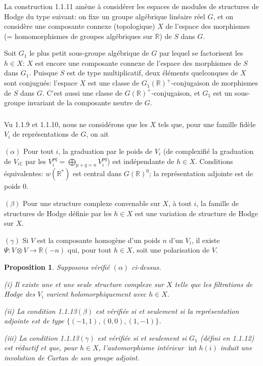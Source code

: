 \documentclass[12pt,a4paper]{article}
\theoremstyle{plain}
\newtheorem{proposition}[theorem]{Proposition}
\theoremstyle{definition}
\theoremstyle{remark}
\DeclareMathOperator{\Int}{int}
\newcommand{\RR}{\mathbb{R}}
\newcommand{\CC}{\mathbb{C}}
\begin{document}
\subsubsection{}

La construction 1.1.11 am\`ene \`a consid\'erer les espaces de modules de structures de Hodge du type suivant: on fixe un groupe alg\'ebrique lin\'eaire r\'eel $G$, et on consid\`ere une composante connexe (topologique) $X$ de l'espace des morphismes (= homomorphismes de groupes alg\'ebriques sur $\RR$) de $S$ dans $G$.

Soit $G_1$ le plus petit sous-groupe alg\'ebrique de $G$ par lequel se factorisent les $h \in X$: $X$ est encore une composante connexe de l'espace des morphismes de $S$ dans $G_1$. Puisque $S$ est de type multiplicatif, deux \'el\'ements quelconques de $X$ sont conjugu\'es: l'espace $X$ est une classe de $G_1(\RR)^+$-conjugaison de morphismes de $S$ dans $G$. C'est aussi une classe de $G(\RR)^+$-conjugaison, et $G_1$ est un sous-groupe invariant de la composante neutre de $G$.

\subsubsection{}

Vu 1.1.9 et 1.1.10, nous ne consid\'erons que les $X$ tels que, pour une famille fid\`ele $V_i$ de repr\'esentations de $G$, on ait

$(\alpha)$ Pour tout $i$, la graduation par le poids de $V_i$ (de complexifi\'e la graduation de $V_{i\CC}$ par les $V_i^{pq} = \bigoplus_{p+q=n} V_i^{pq}$) est ind\'ependante de $h \in X$. Conditions \'equivalentes: $w(\RR^*)$ est central dans $G(\RR)^0$; la repr\'esentation adjointe est de poids 0.

$(\beta)$ Pour une structure complexe convenable sur $X$, \`a tout $i$, la famille de structures de Hodge d\'efinie par les $h \in X$ est une variation de structure de Hodge sur $X$.

$(\gamma)$ Si $V$ est la composante homog\`ene d'un poids $n$ d'un $V_i$, il existe $\Psi:V \otimes V \to \RR(-n)$ qui, pour tout $h \in X$, soit une polarisation de $V$.

\begin{proposition}
Supposons v\'erifi\'e $(\alpha)$ ci-dessus.

\textup{(i)} Il existe une et une seule structure complexe sur $X$ telle que les filtrations de Hodge des $V_i$ varient holomorphiquement avec $h \in X$.

\textup{(ii)} La condition 1.1.13$(\beta)$ est v\'erifi\'ee si et seulement si la repr\'esentation adjointe est de type $\{(-1,1),(0,0),(1,-1)\}$.

\textup{(iii)} La condition 1.1.13$(\gamma)$ est v\'erifi\'ee si et seulement si $G_1$ (d\'efini en 1.1.12) est r\'eductif et que, pour $h \in X$, l'automorphisme int\'erieur $\Int h(i)$ induit une involution de Cartan de son groupe adjoint.
\end{proposition}
\end{document}
